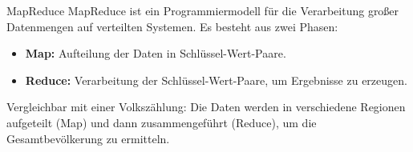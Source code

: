 \documentclass{beamer}
\begin{document}
\begin{frame}{MapReduce}
    MapReduce ist ein Programmiermodell für die Verarbeitung großer Datenmengen auf verteilten Systemen. Es besteht aus zwei Phasen:
    \begin{itemize}
        \item \textbf{Map:} Aufteilung der Daten in Schlüssel-Wert-Paare.
        \item \textbf{Reduce:} Verarbeitung der Schlüssel-Wert-Paare, um Ergebnisse zu erzeugen.
    \end{itemize}
    Vergleichbar mit einer Volkszählung: Die Daten werden in verschiedene Regionen aufgeteilt (Map) und dann zusammengeführt (Reduce), um die Gesamtbevölkerung zu ermitteln.
\end{frame}
\end{document}
